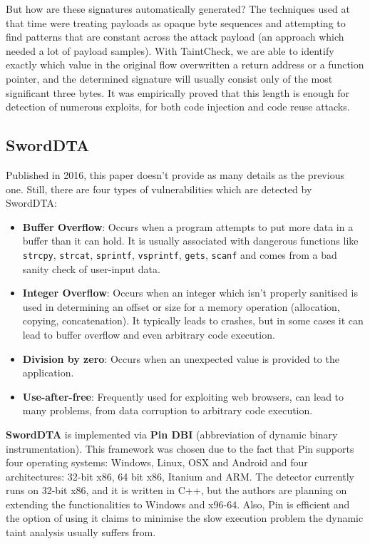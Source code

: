 \documentclass[10pt,a4paper,english,onecolumn]{IEEEtran}
\begin{document}
But how are these signatures automatically generated? The techniques used at that time were treating payloads as opaque byte sequences and attempting to find patterns that are constant across the attack payload (an approach which needed a lot of payload samples). With TaintCheck, we are able to identify exactly which value in the original flow overwritten a return address or a function pointer, and the determined signature will usually consist only of the most significant three bytes. It was empirically proved that this length is enough for detection of numerous exploits, for both code injection and code reuse attacks.

\subsection{SwordDTA}

Published in 2016, this paper doesn't provide as many details as the previous one. Still, there are four types of vulnerabilities which are detected by SwordDTA:

\begin{itemize}
    \item \textbf{Buffer Overflow}: Occurs when a program attempts to put more data in a buffer than it can hold. It is usually associated with dangerous functions like \texttt{strcpy}, \texttt{strcat}, \texttt{sprintf}, \texttt{vsprintf}, \texttt{gets}, \texttt{scanf} and comes from a bad sanity check of user-input data.
    \item \textbf{Integer Overflow}: Occurs when an integer which isn't properly sanitised is used in determining an offset or size for a memory operation (allocation, copying, concatenation). It typically leads to crashes, but in some cases it can lead to buffer overflow and even arbitrary code execution.
    \item \textbf{Division by zero}: Occurs when an unexpected value is provided to the application.
    \item \textbf{Use-after-free}: Frequently used for exploiting web browsers, can lead to many problems, from data corruption to arbitrary code execution.
\end{itemize}

\textbf{SwordDTA} is implemented via \textbf{Pin DBI} (abbreviation of dynamic binary instrumentation). This framework was chosen due to the fact that Pin supports four operating systems: Windows, Linux, OSX and Android and four architectures: 32-bit x86, 64 bit x86, Itanium and ARM. The detector currently runs on 32-bit x86, and it is written in C++, but the authors are planning on extending the functionalities to Windows and x96-64. Also, Pin is efficient and the option of using it claims to minimise the slow execution problem the dynamic taint analysis usually suffers from.
\end{document}
